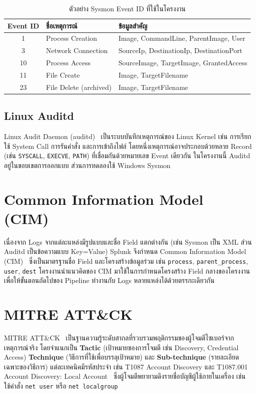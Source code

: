\begin{table}[ht]
  \centering
  \caption{ตัวอย่าง Sysmon Event ID ที่ใช้ในโครงงาน}
  \label{tab:sysmon-eid}
  \begin{tabular}{|c|l|l|}
    \hline
    \textbf{Event ID} & \textbf{ชื่อเหตุการณ์} & \textbf{ข้อมูลสำคัญ} \\ \hline
    1  & Process Creation        & Image, CommandLine, ParentImage, User \\ \hline
    3  & Network Connection      & SourceIp, DestinationIp, DestinationPort \\ \hline
    10 & Process Access          & SourceImage, TargetImage, GrantedAccess \\ \hline
    11 & File Create             & Image, TargetFilename \\ \hline
    23 & File Delete (archived)  & Image, TargetFilename \\ \hline
  \end{tabular}
\end{table}

\subsection{Linux Auditd}
Linux Audit Daemon (auditd)~\cite{auditd} เป็นระบบบันทึกเหตุการณ์ของ Linux Kernel
เช่น การเรียกใช้ System Call การรันคำสั่ง และการเข้าถึงไฟล์
โดยหนึ่งเหตุการณ์อาจประกอบด้วยหลาย Record (เช่น \texttt{SYSCALL}, \texttt{EXECVE}, \texttt{PATH})
ที่เชื่อมกันด้วยหมายเลข Event เดียวกัน
ในโครงงานนี้ Auditd อยู่ในขอบเขตการออกแบบ ส่วนการทดลองใช้ Windows Sysmon

\section{Common Information Model (CIM)}
เนื่องจาก Logs จากแต่ละแหล่งมีรูปแบบและชื่อ Field แตกต่างกัน
(เช่น Sysmon เป็น XML ส่วน Auditd เป็นข้อความแบบ Key=Value)
Splunk จึงกำหนด Common Information Model (CIM)~\cite{splunk-cim}
ซึ่งเป็นมาตรฐานชื่อ Field และโครงสร้างข้อมูลร่วม เช่น \texttt{process}, \texttt{parent\_process}, \texttt{user}, \texttt{dest}
โครงงานนำแนวคิดของ CIM มาใช้ในการกำหนดโครงสร้าง Field กลางของโครงงาน เพื่อให้ขั้นตอนถัดไปของ Pipeline ทำงานกับ Logs หลายแหล่งได้ด้วยตรรกะเดียวกัน

\section{MITRE ATT\&CK}
MITRE ATT\&CK~\cite{mitre-attack,strom2018attack} เป็นฐานความรู้ระดับสากลที่รวบรวมพฤติกรรมของผู้โจมตีไซเบอร์จากเหตุการณ์จริง
โดยจำแนกเป็น \textbf{Tactic} (เป้าหมายของการโจมตี เช่น Discovery, Credential Access)
\textbf{Technique} (วิธีการที่ใช้เพื่อบรรลุเป้าหมาย) และ \textbf{Sub-technique} (รายละเอียดเฉพาะของวิธีการ)
แต่ละเทคนิคมีรหัสประจำ เช่น T1087 Account Discovery และ T1087.001 Account Discovery: Local Account~\cite{mitre-t1087-001}
ซึ่งผู้โจมตีพยายามดึงรายชื่อบัญชีผู้ใช้ภายในเครื่อง เช่น ใช้คำสั่ง \texttt{net user} หรือ \texttt{net localgroup}

